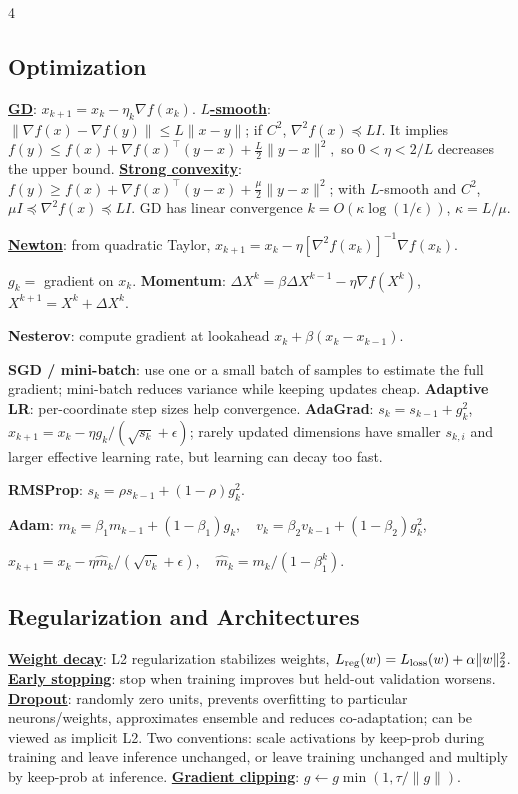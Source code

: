 \documentclass{article}
\newcommand{\key}[1]{\textbf{#1}}
\newcommand{\lowterm}[1]{\textbf{\underline{#1}}}
\newcommand{\1}{\mathbf 1}
\begin{document}
\begin{multicols*}{4}
\subsection{Optimization}
\lowterm{GD}: $x_{k+1}=x_k-\eta_k\nabla f(x_k)$. \lowterm{$L$-smooth}: $\|\nabla f(x)-\nabla f(y)\|\le L\|x-y\|$; if $C^2$, $\nabla^2f(x)\preceq LI$. It implies
\(
f(y)\le f(x)+\nabla f(x)^\top(y-x)+\frac L2\|y-x\|^2,
\)
so $0<\eta<2/L$ decreases the upper bound. 
\lowterm{Strong convexity}: $f(y)\ge f(x)+\nabla f(x)^\top(y-x)+\frac\mu2\|y-x\|^2$; with $L$-smooth and $C^2$, $\mu I\preceq\nabla^2f(x)\preceq LI$. GD has linear convergence $k=O(\kappa\log(1/\epsilon))$, $\kappa=L/\mu$.

\lowterm{Newton}: from quadratic Taylor,
\(
x_{k+1}=x_k-\eta[\nabla^2f(x_k)]^{-1}\nabla f(x_k).
\)

$g_k=$ gradient on $x_k$. 
\key{Momentum}: $\Delta X^k=\beta\Delta X^{k-1}-\eta\nabla f(X^k)$, $X^{k+1}=X^k+\Delta X^k$.

\key{Nesterov}: compute gradient at lookahead $x_k+\beta(x_k-x_{k-1})$.

\key{SGD / mini-batch}: use one or a small batch of samples to estimate the full gradient; mini-batch reduces variance while keeping updates cheap. \key{Adaptive LR}: per-coordinate step sizes help convergence. \key{AdaGrad}: $s_k=s_{k-1}+g_k^2$, $x_{k+1}=x_k-\eta g_k/(\sqrt{s_k}+\epsilon)$; rarely updated dimensions have smaller $s_{k,i}$ and larger effective learning rate, but learning can decay too fast. 

\key{RMSProp}: $s_k=\rho s_{k-1}+(1-\rho)g_k^2$. 

\key{Adam}:
\(
m_k=\beta_1m_{k-1}+(1-\beta_1)g_k,\quad v_k=\beta_2v_{k-1}+(1-\beta_2)g_k^2,
\)

\(
x_{k+1}=x_k-\eta\hat m_k/(\sqrt{\hat v_k}+\epsilon),\quad
\hat m_k=m_k/(1-\beta_1^k).
\)

\subsection{Regularization and Architectures}
\lowterm{Weight decay}: L2 regularization stabilizes weights, $L_{\rm reg}(w)=L_{\rm loss}(w)+\alpha\|w\|_2^2$. \lowterm{Early stopping}: stop when training improves but held-out validation worsens. \lowterm{Dropout}: randomly zero units, prevents overfitting to particular neurons/weights, approximates ensemble and reduces co-adaptation; can be viewed as implicit L2. Two conventions: scale activations by keep-prob during training and leave inference unchanged, or leave training unchanged and multiply by keep-prob at inference. \lowterm{Gradient clipping}: $g\leftarrow g\min(1,\tau/\|g\|)$.


\end{multicols*}
\end{document}
